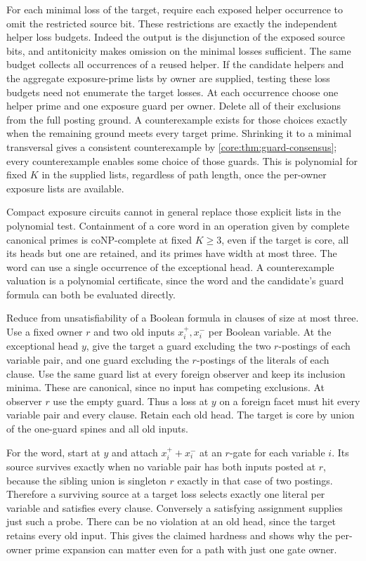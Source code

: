 For each minimal loss of the target, require each exposed
helper occurrence to omit the restricted source bit. These
restrictions are exactly the independent helper loss budgets.
Indeed the output is the disjunction of the exposed source
bits, and antitonicity makes omission on the minimal losses
sufficient. The same budget collects all occurrences of a
reused helper. If the candidate helpers and the aggregate
exposure-prime lists by owner are supplied, testing these
loss budgets need not enumerate the target losses. At each
occurrence choose one helper prime and one exposure guard per
owner. Delete all of their exclusions from the full posting
ground. A counterexample exists for those choices exactly
when the remaining ground meets every target prime. Shrinking
it to a minimal transversal gives a consistent counterexample
by \cref{core:thm:guard-consensus}; every counterexample
enables some choice of those guards. This is polynomial for
fixed $K$ in the supplied lists, regardless of path length,
once the per-owner exposure lists are available.

Compact exposure circuits cannot in general replace those
explicit lists in the polynomial test. Containment of a core
word in an operation given by complete canonical primes is
coNP-complete at fixed $K\geq3$, even if the target is core,
all its heads but one are retained, and its primes have width
at most three. The word can use a single occurrence of the
exceptional head. A counterexample valuation is a polynomial
certificate, since the word and the candidate's guard formula
can both be evaluated directly.

Reduce from unsatisfiability of a Boolean formula in clauses
of size at most three. Use a fixed owner $r$ and two old
inputs $x_i^+,x_i^-$ per Boolean variable. At the exceptional
head $y$, give the target a guard excluding the two $r$-postings
of each variable pair, and one guard excluding the $r$-postings
of the literals of each clause. Use the same guard list at
every foreign observer and keep its inclusion minima. These
are canonical, since no input has competing exclusions. At
observer $r$ use the empty guard. Thus a loss at $y$ on a
foreign facet must hit every variable pair and every clause.
Retain each old head. The target is core by union of the
one-guard spines and all old inputs.

For the word, start at $y$ and attach $x_i^++x_i^-$ at an
$r$-gate for each variable $i$. Its source survives exactly
when no variable pair has both inputs posted at $r$, because
the sibling union is singleton $r$ exactly in that case of
two postings. Therefore a surviving source at a target loss
selects exactly one literal per variable and satisfies every
clause. Conversely a satisfying assignment supplies just
such a probe. There can be no violation at an old head, since
the target retains every old input. This gives the claimed
hardness and shows why the per-owner prime expansion can
matter even for a path with just one gate owner.

